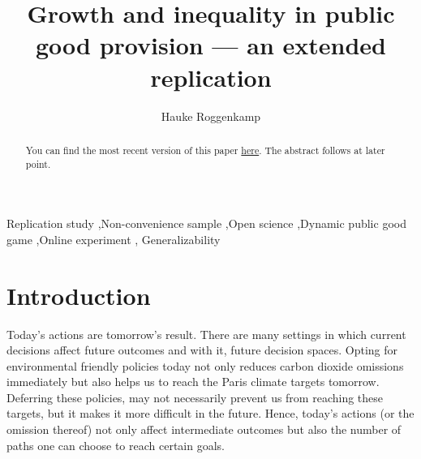 \documentclass[
  authoryear,
  preprint,
  3p]{elsarticle}
\begin{document}
\begin{frontmatter}
\title{Growth and inequality in public good provision --- an extended
replication}
\author[1,2]{Hauke Roggenkamp%
%
}



        
\begin{abstract}
You can find the most recent version of this paper
\href{https://github.com/Howquez/coopUncertainty/blob/main/analysis/quarto/paper.pdf}{here}.
The abstract follows at later point.
\end{abstract}





\begin{keyword}
    Replication study \sep Non-convenience sample \sep Open
science \sep Dynamic public good game \sep Online experiment \sep 
    Generalizability
\end{keyword}
\end{frontmatter}\ifdefined\Shaded\renewenvironment{Shaded}{\begin{tcolorbox}[enhanced, frame hidden, interior hidden, boxrule=0pt, borderline west={3pt}{0pt}{shadecolor}, sharp corners, breakable]}{\end{tcolorbox}}\fi

\hypertarget{sec-intro}{%
\section{Introduction}\label{sec-intro}}

Today's actions are tomorrow's result. There are many settings in which
current decisions affect future outcomes and with it, future decision
spaces. Opting for environmental friendly policies today not only
reduces carbon dioxide omissions immediately but also helps us to reach
the Paris climate targets tomorrow. Deferring these policies, may not
necessarily prevent us from reaching these targets, but it makes it more
difficult in the future. Hence, today's actions (or the omission
thereof) not only affect intermediate outcomes but also the number of
paths one can choose to reach certain goals.
\end{document}
